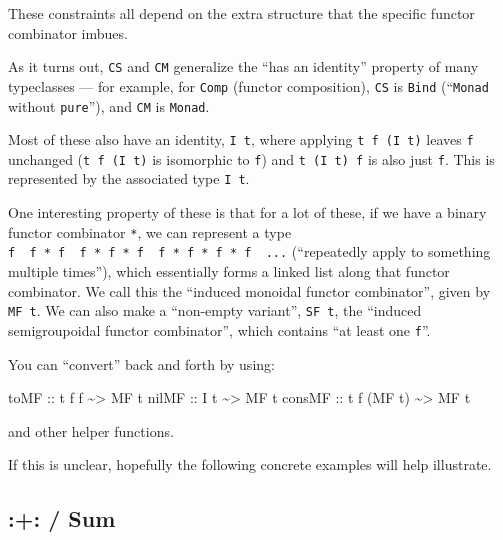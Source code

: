 \documentclass[]{article}
\newenvironment{Shaded}{}{}
\newcommand{\DataTypeTok}[1]{\textcolor[rgb]{0.56,0.13,0.00}{#1}}
\newcommand{\NormalTok}[1]{#1}
\newcommand{\OperatorTok}[1]{\textcolor[rgb]{0.40,0.40,0.40}{#1}}
\newcommand{\OtherTok}[1]{\textcolor[rgb]{0.00,0.44,0.13}{#1}}
\begin{document}
These constraints all depend on the extra structure that the specific functor
combinator imbues.

As it turns out, \texttt{CS} and \texttt{CM} generalize the ``has an identity''
property of many typeclasses --- for example, for \texttt{Comp} (functor
composition), \texttt{CS} is \texttt{Bind} (``\texttt{Monad} without
\texttt{pure}''), and \texttt{CM} is \texttt{Monad}.

Most of these also have an identity, \texttt{I\ t}, where applying
\texttt{t\ f\ (I\ t)} leaves \texttt{f} unchanged (\texttt{t\ f\ (I\ t)} is
isomorphic to \texttt{f}) and \texttt{t\ (I\ t)\ f} is also just \texttt{f}.
This is represented by the associated type \texttt{I\ t}.

One interesting property of these is that for a lot of these, if we have a
binary functor combinator \texttt{*}, we can represent a type
\texttt{f\ \textbar{}\ f\ *\ f\ \textbar{}\ f\ *\ f\ *\ f\ \textbar{}\ f\ *\ f\ *\ f\ *\ f\ \textbar{}\ ...}
(``repeatedly apply to something multiple times''), which essentially forms a
linked list along that functor combinator. We call this the ``induced monoidal
functor combinator'', given by \texttt{MF\ t}. We can also make a ``non-empty
variant'', \texttt{SF\ t}, the ``induced semigroupoidal functor combinator'',
which contains ``at least one \texttt{f}''.

You can ``convert'' back and forth by using:

\begin{Shaded}
\begin{Highlighting}[]
\OtherTok{toMF   ::}\NormalTok{ t f f }\OperatorTok{\textasciitilde{}>} \DataTypeTok{MF}\NormalTok{ t}
\OtherTok{nilMF  ::} \DataTypeTok{I}\NormalTok{ t }\OperatorTok{\textasciitilde{}>} \DataTypeTok{MF}\NormalTok{ t}
\OtherTok{consMF ::}\NormalTok{ t f (}\DataTypeTok{MF}\NormalTok{ t) }\OperatorTok{\textasciitilde{}>} \DataTypeTok{MF}\NormalTok{ t}
\end{Highlighting}
\end{Shaded}

and other helper functions.

If this is unclear, hopefully the following concrete examples will help
illustrate.

\hypertarget{sum}{%
\subsection{:+: / Sum}\label{sum}}
\end{document}
